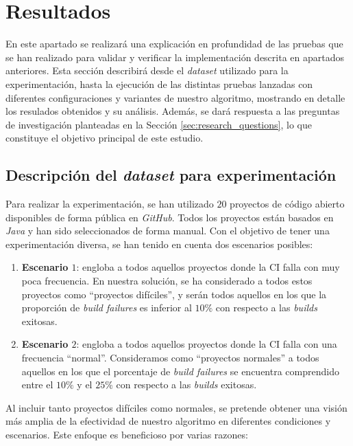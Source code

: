 \section{Resultados}

En este apartado se realizará una explicación en profundidad de las pruebas que se han realizado
para validar y verificar la implementación descrita en apartados anteriores. Esta sección
describirá desde el \textit{dataset} utilizado para la experimentación, hasta la ejecución
de las distintas pruebas lanzadas con diferentes configuraciones y variantes de nuestro 
algoritmo, mostrando en detalle los resulados obtenidos y su análisis. Además, se dará respuesta
a las preguntas de investigación planteadas en la Sección \ref{sec:research_questions}, lo que
constituye el objetivo principal de este estudio.


\subsection{Descripción del \textit{dataset} para experimentación}
Para realizar la experimentación, se han utilizado $20$ proyectos de código abierto disponibles
de forma pública en \textit{GitHub}. Todos los proyectos están basados en \textit{Java} y
han sido seleccionados de forma manual. Con el objetivo de tener una experimentación diversa,
se han tenido en cuenta dos escenarios posibles:

\begin{enumerate}
    \item \textbf{Escenario $1$}: engloba a todos aquellos proyectos donde la  CI falla con muy
    poca frecuencia. En nuestra solución, se ha considerado a todos estos proyectos como
    ``proyectos difíciles'', y serán todos aquellos en los que la proporción de \textit{build
    failures} es inferior al $10\%$ con respecto a las \textit{builds} exitosas.\\

    \item \textbf{Escenario $2$}: engloba a todos aquellos proyectos donde la CI falla con
    una frecuencia ``normal''. Consideramos como ``proyectos normales'' a todos aquellos en los
    que el porcentaje de \textit{build failures} se encuentra comprendido entre el $10\%$ y el
    $25\%$ con respecto a las \textit{builds} exitosas.\\
\end{enumerate}

Al incluir tanto proyectos difíciles como normales, se pretende obtener una visión más amplia
de la efectividad de nuestro algoritmo en diferentes condiciones y escenarios. Este enfoque
es beneficioso por varias razones:

